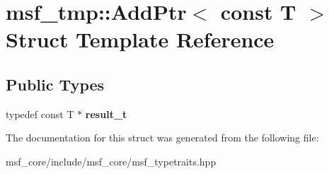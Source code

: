 \hypertarget{structmsf__tmp_1_1AddPtr_3_01const_01T_01_4}{\section{msf\-\_\-tmp\-:\-:Add\-Ptr$<$ const T $>$ Struct Template Reference}
\label{structmsf__tmp_1_1AddPtr_3_01const_01T_01_4}
}
\subsection*{Public Types}
\begin{DoxyCompactItemize}
\item 
\hypertarget{structmsf__tmp_1_1AddPtr_3_01const_01T_01_4_a7fed44d9f82eab74ebc3afd453547904}{typedef const T $\ast$ {\bfseries result\-\_\-t}}\label{structmsf__tmp_1_1AddPtr_3_01const_01T_01_4_a7fed44d9f82eab74ebc3afd453547904}

\end{DoxyCompactItemize}


The documentation for this struct was generated from the following file\-:\begin{DoxyCompactItemize}
\item 
msf\-\_\-core/include/msf\-\_\-core/msf\-\_\-typetraits.\-hpp\end{DoxyCompactItemize}
